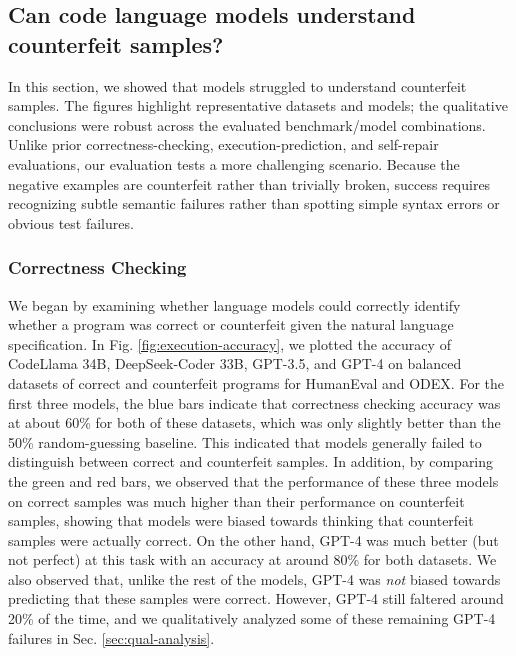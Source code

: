 \subsection{Can code language models understand counterfeit samples?} \label{sec:understanding-counterfeit}
In this section, we showed that models struggled to understand counterfeit samples. The figures highlight representative datasets and models; the qualitative conclusions were robust across the evaluated benchmark/model combinations.
Unlike prior correctness-checking, execution-prediction, and self-repair evaluations, our evaluation tests a more challenging scenario. Because the negative examples are counterfeit rather than trivially broken, success requires recognizing subtle 
semantic failures rather than spotting simple syntax errors or obvious test failures.

\subsubsection{Correctness Checking}
We began by examining whether language models could correctly identify whether a program was correct or counterfeit given the natural language specification. In Fig. \ref{fig:execution-accuracy}, we plotted the accuracy of CodeLlama 34B, DeepSeek-Coder 33B, GPT-3.5, and GPT-4 on balanced datasets of correct and counterfeit programs for HumanEval and ODEX. For the first three models, the blue bars indicate that correctness checking accuracy was at about 60\% for both of these datasets, which was only slightly better than the 50\% random-guessing baseline. This indicated that models generally failed to distinguish between correct and counterfeit samples. In addition, by comparing the green and red bars, we observed that the performance of these three models on correct samples was much higher than their performance on counterfeit samples, showing that models were biased towards thinking that counterfeit samples were actually correct. On the other hand, GPT-4 was much better (but not perfect) at this task with an accuracy at around 80\% for both datasets. We also observed that, unlike the rest of the models, GPT-4 was \textit{not} biased towards predicting that these samples were correct. However, GPT-4 still faltered around 20\% of the time, and we qualitatively analyzed some of these remaining GPT-4 failures in Sec. \ref{sec:qual-analysis}.

